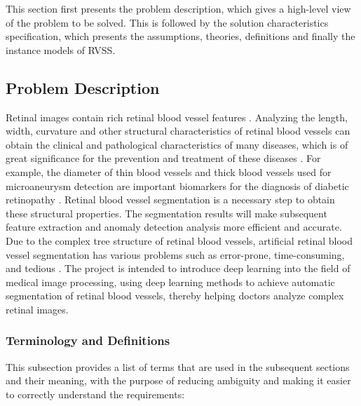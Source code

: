 \documentclass[12pt]{article}
\begin{document}
This section first presents the problem description, which gives a high-level view of the problem to be solved. This is followed by the solution characteristics specification, which presents the assumptions, theories, definitions and finally the instance models of RVSS. 

\subsection{Problem Description} \label{Sec_pd}

Retinal images contain rich retinal blood vessel features \cite{wu2020nfn+,li2020lightweight}. Analyzing the length, width, curvature and other structural characteristics of retinal blood vessels can obtain the clinical and pathological characteristics of many diseases, which is of great significance for the prevention and treatment of these diseases \cite{wu2021scs,wang2020dofe}. For example, the diameter of thin blood vessels and thick blood vessels used for microaneurysm detection are important biomarkers for the diagnosis of diabetic retinopathy \cite{yan2018three}. Retinal blood vessel segmentation is a necessary step to obtain these structural properties. The segmentation results will make subsequent feature extraction and anomaly detection analysis more efficient and accurate. Due to the complex tree structure of retinal blood vessels, artificial retinal blood vessel segmentation has various problems such as error-prone, time-consuming, and tedious \cite{jin2019dunet,oliveira2018retinal}. The project is intended to introduce deep learning into the field of medical image processing, using deep learning methods to achieve automatic segmentation of retinal blood vessels, thereby helping doctors analyze complex retinal images.

\subsubsection{Terminology and  Definitions}

This subsection provides a list of terms that are used in the subsequent sections and their meaning, with the purpose of reducing ambiguity and making it easier to correctly understand the requirements:
\end{document}
